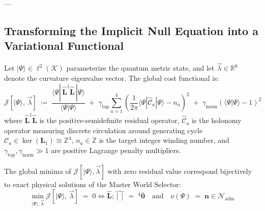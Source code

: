 \documentclass[
    12pt,
    a4paper,
    headings=normal,
    twoside=false,
    open=any,
    parskip=half
]{scrbook}
\newcommand{\spectrumN}{\mathcal{N}_{\text{adm}}}
\begin{document}
---

\subsection{Transforming the Implicit Null Equation into a Variational Functional}

\begin{physdefinition}\label{def:ch4_variational_cost_functional}
Let $|\Psi\rangle \in \ell^2(\mathcal{K})$ parameterize the quantum metric state, and let $\vec{\lambda} \in \mathbb{R}^6$ denote the curvature eigenvalue vector. The global cost functional is:
\begin{equation}
\boxed{\mathcal{J}[|\Psi\rangle, \, \vec{\lambda}] \;\coloneqq\; \frac{\langle \Psi | \, \hat{\mathbf{L}}^\dagger \hat{\mathbf{L}} \, | \Psi \rangle}{\langle \Psi | \Psi \rangle} \;+\; \gamma_{\text{top}} \sum_{a=1}^4 \left( \frac{1}{2\pi}\langle \Psi | \hat{\mathcal{C}}_a | \Psi \rangle - n_a \right)^2 \;+\; \gamma_{\text{norm}} \left( \langle \Psi | \Psi \rangle - 1 \right)^2}
\label{eq:ch4_cost_functional_master}
\end{equation}
where $\hat{\mathbf{L}}^\dagger \hat{\mathbf{L}}$ is the positive-semidefinite residual operator, $\hat{\mathcal{C}}_a$ is the holonomy operator measuring discrete circulation around generating cycle $\mathcal{C}_a \in \ker(\mathbf{L}_1) \cong \mathbb{Z}^4$, $n_a \in \mathbb{Z}$ is the target integer winding number, and $\gamma_{\text{top}}, \gamma_{\text{norm}} \gg 1$ are positive Lagrange penalty multipliers.
\end{physdefinition}

\begin{phystheorem}\label{thm:ch4_bijective_minima}
The global minima of $\mathcal{J}[|\Psi\rangle, \vec{\lambda}]$ with zero residual value correspond bijectively to exact physical solutions of the Master World Selector:
\begin{equation}
\min_{|\Psi\rangle, \vec{\lambda}} \mathcal{J}[|\Psi\rangle, \, \vec{\lambda}] \;=\; 0 \iff \hat{\mathbf{L}} ; \hat{\mathbf{[]}} \;=\; {}^4\bar{\mathbf{0}} \quad \text{and} \quad \nu(\Psi) \;=\; \mathbf{n} \in \spectrumN
\label{eq:ch4_bijective_minima}
\end{equation}
\end{phystheorem}
\end{document}
